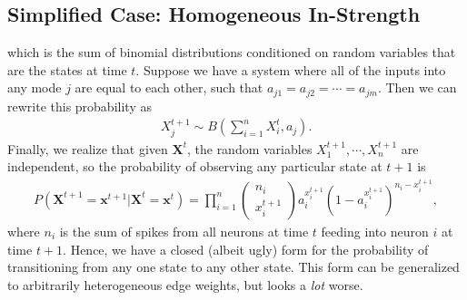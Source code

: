 \documentclass[superscriptaddress]{revtex4-1}
\begin{document}
\subsection{Simplified Case: Homogeneous In-Strength}
which is the sum of binomial distributions conditioned on random variables that are the states at time $t$. Suppose we have a system where all of the inputs into any mode $j$ are equal to each other, such that $a_{j1} = a_{j2} = \dotsm = a_{jm}$. Then we can rewrite this probability as
\begin{align*}
X_j^{t+1} \sim B\left(\sum_{i=1}^{n} X_i^t, a_j\right).
\end{align*}
Finally, we realize that given $\bm{X}^t$, the random variables $X_1^{t+1}, \dotsm, X_n^{t+1}$ are independent, so the probability of observing any particular state at $t+1$ is
\begin{align}
\label{eq:prob_homoin}
P(\bm{X}^{t+1} = \bm{x}^{t+1} | \bm{X}^t = \bm{x}^t) = \prod_{i=1}^n \begin{pmatrix} n_i \\ x_i^{t+1}\end{pmatrix} a_i^{x_i^{t+1}} (1-a_i^{x_i^{t+1}})^{n_i-x_i^{t+1}},
\end{align}
where $n_i$ is the sum of spikes from all neurons at time $t$ feeding into neuron $i$ at time $t+1$. Hence, we have a closed (albeit ugly) form for the probability of transitioning from any one state to any other state. This form can be generalized to arbitrarily heterogeneous edge weights, but looks a \emph{lot} worse.
\end{document}
